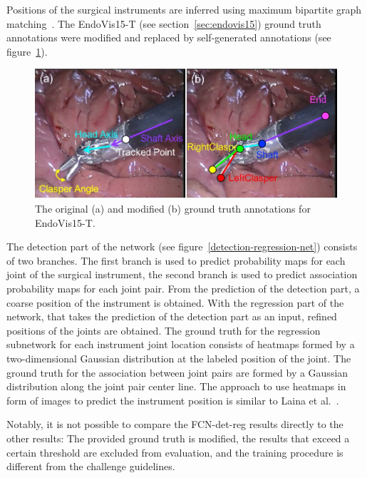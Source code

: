 Positions of the surgical instruments are inferred using maximum bipartite graph matching~\cite{bipartite_graph2005schwartz}.
The EndoVis15-T (see section~\ref{sec:endovis15}) ground truth annotations were modified and replaced by self-generated annotations (see figure~\ref{modified_gt_2D_pose}).

\begin{figure}
\centering
\includegraphics[width=.6\textwidth]{images/dataset/annotated_gt.png}
\caption[Modified ground truth annotation~\cite{du2018_2D_pose_est_CNN}]{The original (a) and modified (b) ground truth annotations for EndoVis15-T.}
\label{modified_gt_2D_pose}
\end{figure}

The detection part of the network (see figure~\ref{detection-regression-net}) consists of two branches. 
The first branch is used to predict probability maps for each joint of the surgical instrument, 
the second branch is used to predict association probability maps for each joint pair.
From the prediction of the detection part, a coarse position of the instrument is obtained. With the regression part of the network, that takes the prediction of the detection part as an input, refined positions of the joints are obtained.
The ground truth for the regression subnetwork for each instrument joint location consists of heatmaps formed by a two-dimensional Gaussian distribution at the labeled position of the joint. 
The ground truth for the association between joint pairs are formed by a Gaussian distribution along the joint pair center line.
The approach to use heatmaps in form of images to predict the instrument position is similar to Laina et al.~\cite{Laina2017}.

Notably, it is not possible to compare the FCN-det-reg results directly to the other results: The provided ground truth is modified, the results that exceed a certain threshold are excluded from evaluation, and the training procedure is different from the challenge guidelines.

